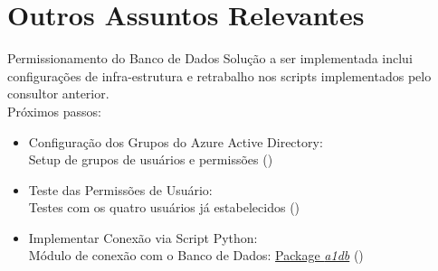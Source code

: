 \documentclass[t,aspectratio=169]{beamer}
\begin{document}
\section[Outros]{Outros Assuntos Relevantes}
\begin{frame}{Permissionamento do Banco de Dados}
	Solução a ser implementada inclui configurações de infra-estrutura e retrabalho nos scripts implementados pelo consultor anterior.\\
	Próximos passos:
	\begin{itemize}
		\item {\color{blue1} Configuração dos Grupos do Azure Active Directory:}\\
		Setup de grupos de usuários e permissões ({\color{green}\checkmark})\\
		\item {\color{blue1} Teste das Permissões de Usuário:}\\
		Testes com os quatro usuários já estabelecidos ({\color{green}\checkmark})\\
		\item {\color{blue1} Implementar Conexão via Script Python:}\\
		Módulo de conexão com o Banco de Dados: \href{https://github.com/asset1capital/a1db}{Package \emph{a1db}}  ({\color{green}\checkmark})
	\end{itemize}
\end{frame}
\end{document}
